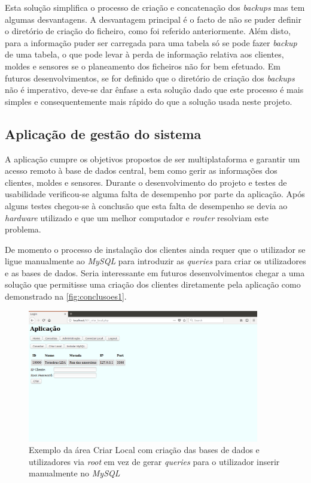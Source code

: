 \documentclass[11pt,twoside,a4paper]{report}
\begin{document}
Esta solução simplifica o processo de criação e concatenação dos \textit{backups} mas tem algumas desvantagens. A desvantagem principal é o facto de não se puder definir o diretório de criação do ficheiro, como foi referido anteriormente. Além disto, para a informação puder ser carregada para uma tabela só se pode fazer \textit{backup} de uma tabela, o que pode levar à perda de informação relativa aos clientes, moldes e sensores se o planeamento dos ficheiros não for bem efetuado. Em futuros desenvolvimentos, se for definido que o diretório de criação dos \textit{backups} não é imperativo, deve-se dar ênfase a esta solução dado que este processo é mais simples e consequentemente mais rápido do que a solução usada neste projeto.

\subsection{Aplicação de gestão do sistema}
A aplicação cumpre os objetivos propostos de ser multiplataforma e garantir um acesso remoto à base de dados central, bem como gerir as informações dos clientes, moldes e sensores. Durante o desenvolvimento do projeto e testes de usabilidade verificou-se alguma falta de desempenho por parte da aplicação. Após alguns testes chegou-se à conclusão que esta falta de desempenho se devia ao \textit{hardware} utilizado e que um melhor computador e \textit{router} resolviam este problema.\par 
De momento o processo de instalação dos clientes ainda requer que o utilizador se ligue manualmente ao \textit{MySQL} para introduzir as \textit{queries} para criar os utilizadores e as bases de dados. Seria interessante em futuros desenvolvimentos chegar a uma solução que permitisse uma criação dos clientes diretamente pela aplicação como demonstrado na \autoref{fig:conclusoes1}.
\begin{figure}[H]
	\begin{center}
		\includegraphics[width=0.9\textwidth]{futuro01} %
		\caption{Exemplo da área Criar Local com criação das bases de dados e utilizadores via \textit{root} em vez de gerar \textit{queries} para o utilizador inserir manualmente no \textit{MySQL}}
		\label{fig:conclusoes1}
	\end{center}
\end{figure}
\end{document}
